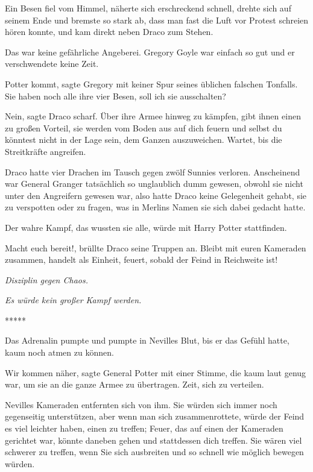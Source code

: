 Ein Besen fiel vom Himmel, näherte sich erschreckend schnell, drehte sich auf
seinem Ende und bremste so stark ab, dass man fast die Luft vor Protest schreien
hören konnte, und kam direkt neben Draco zum Stehen.

Das war keine gefährliche Angeberei. Gregory Goyle war einfach so gut und er
verschwendete keine Zeit.

\glqq{}Potter kommt\grqq{}, sagte Gregory mit keiner Spur seines üblichen
falschen Tonfalls. \glqq{}Sie haben noch alle ihre vier Besen, soll ich sie
ausschalten?\grqq{}

\glqq{}Nein\grqq{}, sagte Draco scharf. \glqq{}Über ihre Armee hinweg zu
kämpfen, gibt ihnen einen zu großen Vorteil, sie werden vom Boden aus auf dich
feuern und selbst du könntest nicht in der Lage sein, dem Ganzen auszuweichen.
Wartet, bis die Streitkräfte angreifen.\grqq{}

Draco hatte vier Drachen im Tausch gegen zwölf Sunnies verloren. Anscheinend war
General Granger tatsächlich so unglaublich dumm gewesen, obwohl sie nicht unter
den Angreifern gewesen war, also hatte Draco keine Gelegenheit gehabt, sie zu
verspotten oder zu fragen, was in Merlins Namen sie sich dabei gedacht hatte.

Der wahre Kampf, das wussten sie alle, würde mit Harry Potter stattfinden.

\glqq{} Macht euch bereit!\grqq{}, brüllte Draco seine Truppen an. \glqq{}Bleibt
mit euren Kameraden zusammen, handelt als Einheit, feuert, sobald der Feind in
Reichweite ist!\grqq{}

\emph{Disziplin gegen Chaos.}

\emph{Es würde kein großer Kampf werden.}

\begin{center}*****\end{center}

Das Adrenalin pumpte und pumpte in Nevilles Blut, bis er das Gefühl hatte, kaum
noch atmen zu können.

\glqq{}Wir kommen näher\grqq{}, sagte General Potter mit einer Stimme, die kaum
laut genug war, um sie an die ganze Armee zu übertragen. \glqq{}Zeit, sich zu
verteilen.\grqq{}

Nevilles Kameraden entfernten sich von ihm. Sie würden sich immer noch
gegenseitig unterstützen, aber wenn man sich zusammenrottete, würde der Feind es
viel leichter haben, einen zu treffen; Feuer, das auf einen der Kameraden
gerichtet war, könnte daneben gehen und stattdessen dich treffen. Sie wären viel
schwerer zu treffen, wenn Sie sich ausbreiten und so schnell wie möglich bewegen
würden.

